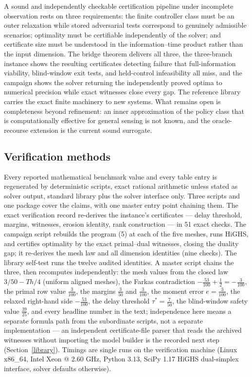 \documentclass[10pt,twocolumn]{article}
\theoremstyle{plain}
\theoremstyle{definition}
\theoremstyle{remark}
\begin{document}
A sound and independently checkable certification pipeline under
incomplete observation rests on three requirements: the finite controller
class must be an outer relaxation while stored adversarial tests correspond
to genuinely admissible scenarios; optimality must be certifiable
independently of the solver; and certificate size must be understood in
the information--time product rather than the input dimension. The bridge theorem delivers all three, the three-branch
instance shows the resulting certificates detecting failure that
full-information viability, blind-window exit tests, and held-control
infeasibility all miss, and the campaign shows the solver returning the independently proved optima
to numerical precision while exact witnesses close every gap.
The reference library carries the exact finite machinery to new systems.
What remains open is completeness beyond refinement: an inner
approximation of the policy class that is computationally effective for
general sensing is not known, and the oracle-recourse extension is the
current sound surrogate.

\subsection{Verification methods}\label{methods}

Every reported mathematical benchmark value and every table entry is
regenerated by deterministic scripts, exact rational arithmetic unless
stated as solver output, standard library plus the solver interface only.
Three scripts and one package cover the claims, with one master entry
point chaining them. The exact
verification record re-derives the instance's certificates --- delay
threshold, margins, witnesses, erosion identity, rank construction ---
in 51 exact checks. The campaign script rebuilds the program (5) at each of
the five meshes, runs HiGHS, and certifies optimality by the exact
primal--dual witnesses, closing the duality gap; it re-derives the mesh law
and all dimension identities (nine checks). The library self-test runs the
twelve audited identities. A master script chains the three, then
recomputes independently: the mesh values from the closed law
\(3/50 - Th/4\) (uniform aligned meshes), the Farkas contradiction
\(-\tfrac{53}{100} + \tfrac12 = -\tfrac{3}{100}\), the primal row value
\(\tfrac{3}{100}\), the margins \(\tfrac{3}{50}\) and \(\tfrac{3}{100}\),
the moment error \(e = \tfrac{3}{100}\), the relaxed right-hand side
\(-\tfrac{53}{100}\), the delay threshold \(\tau^{*} = \tfrac{7}{50}\), the blind-window safety value \(\tfrac{39}{25}\), and every headline
number in the text; independence here means a separate formula path from
the subordinate scripts, not a separate implementation --- an independent
certificate-file parser that reads the archived witnesses without
importing the model builder is the recorded next step
(Section~\ref{library}). Timings are single runs on the verification
machine (Linux x86\_64, Intel Xeon @ 2.60 GHz, Python 3.13, SciPy 1.17
HiGHS dual-simplex interface, solver defaults otherwise).
\end{document}
